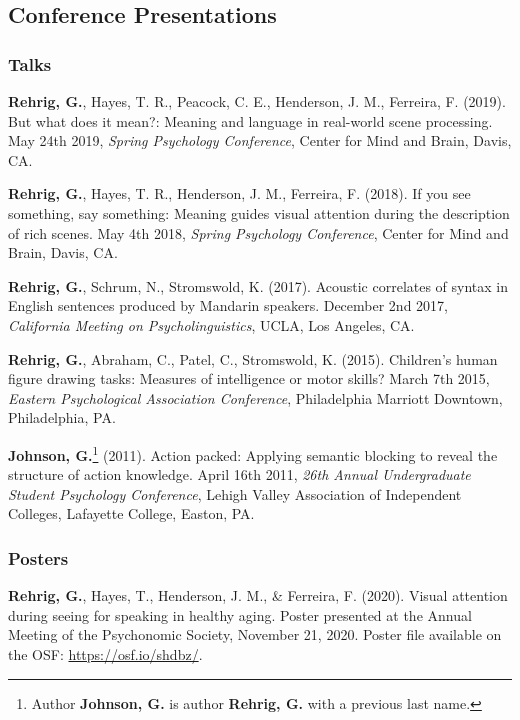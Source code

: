 \subsection*{Conference Presentations}

\subsubsection*{Talks}

\textbf{Rehrig, G.}, Hayes, T. R., Peacock, C. E., Henderson, J. M., Ferreira, F. (2019). But what does it mean?: Meaning and language in real-world scene processing. May 24th 2019, \textit{Spring Psychology Conference}, Center for Mind and Brain, Davis, CA.


\textbf{Rehrig, G.}, Hayes, T. R., Henderson, J. M., Ferreira, F. (2018). If you see something, say something: Meaning guides visual attention during the description of rich scenes. May 4th 2018, \textit{Spring Psychology Conference}, Center for Mind and Brain, Davis, CA.


\textbf{Rehrig, G.}, Schrum, N., Stromswold, K. (2017). Acoustic correlates of syntax in English sentences produced by Mandarin speakers. December 2nd 2017, \textit{California Meeting on Psycholinguistics}, UCLA, Los Angeles, CA.



\textbf{Rehrig, G.}, Abraham, C., Patel, C., Stromswold, K. (2015). Children's human figure drawing tasks: Measures of intelligence or motor skills? March 7th 2015, \textit{Eastern Psychological Association Conference}, Philadelphia Marriott Downtown, Philadelphia, PA.



\textbf{Johnson, G.}\footnote{Author \textbf{Johnson, G.} is author \textbf{Rehrig, G.} with a previous last name.} (2011). Action packed: Applying semantic blocking to reveal the structure of action knowledge.  April 16th 2011, \textit{26th Annual Undergraduate Student Psychology Conference}, Lehigh Valley Association of Independent Colleges, Lafayette College, Easton, PA.

\subsubsection*{Posters}


\textbf{Rehrig, G.}, Hayes, T., Henderson, J. M., \& Ferreira, F. (2020). Visual attention during seeing for speaking in healthy aging. Poster presented at the Annual Meeting of the Psychonomic Society, November 21, 2020. Poster file available on the OSF: \url{https://osf.io/shdbz/}. 

